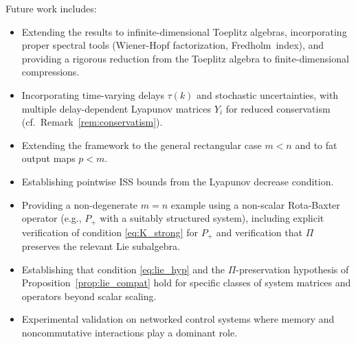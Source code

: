 \documentclass[10pt]{amsart}
\numberwithin{equation}{section}
\begin{document}
Future work includes:
\begin{itemize}
  \item Extending the results to infinite-dimensional Toeplitz algebras, incorporating
        proper spectral tools (Wiener-Hopf factorization, Fredholm~index), and providing
        a rigorous reduction from the Toeplitz algebra to finite-dimensional compressions.
  \item Incorporating time-varying delays $\tau(k)$ and stochastic uncertainties, with
        multiple delay-dependent Lyapunov matrices $Y_i$ for reduced conservatism
        (cf.\ Remark~\ref{rem:conservatism}).
  \item Extending the framework to the general rectangular case $m < n$ and to fat
        output maps $p < m$.
  \item Establishing pointwise ISS bounds from the Lyapunov decrease condition.
  \item Providing a non-degenerate $m=n$ example using a non-scalar Rota-Baxter
        operator (e.g., $P_+$ with a suitably structured system), including explicit
        verification of condition \eqref{eq:K_strong} for $P_+$ and verification that
        $\Pi$ preserves the relevant Lie subalgebra.
  \item Establishing that condition \eqref{eq:lie_hyp} and the $\Pi$-preservation
        hypothesis of Proposition~\ref{prop:lie_compat} hold for specific classes of
        system matrices and operators beyond scalar scaling.
  \item Experimental validation on networked control systems where memory and
        noncommutative interactions play a dominant role.
\end{itemize}
\end{document}
